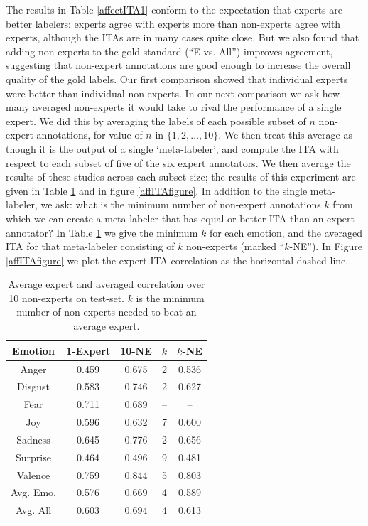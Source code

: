 \documentclass[11pt]{article}
\newlength{\tableReduceBot}
\begin{document}
The results in Table \ref{affectITA1} conform to the expectation that experts are better labelers: experts
agree with experts more than non-experts agree with experts, although the ITAs are in many cases quite close. But we also found that adding non-experts to the gold standard (``E vs. All'')
improves agreement, suggesting that non-expert annotations are good enough
to increase the overall quality of the gold labels.
Our first  comparison showed that individual experts were better than individual non-experts.
In our next comparison we ask how many averaged non-experts it would take to rival the performance of a single expert.
We did this by averaging the labels of each possible subset of $n$ non-expert annotations, for value of $n$ in $\{1, 2, \ldots, 10\}$.  We then treat this average as though it is the output of a single `meta-labeler', and compute the ITA with respect to each subset of five of the six expert annotators.  We then average the results of these studies across each subset size; the results of this experiment are given in Table \ref{affectITA2} and in figure \ref{affITAfigure}.  In addition to the single meta-labeler, we ask:  what is the minimum number of non-expert annotations $k$ from which we can create a meta-labeler that has equal or better ITA than an expert annotator?  In Table \ref{affectITA2} we give the minimum $k$ for each emotion, and the averaged ITA for that meta-labeler consisting of $k$ non-experts (marked ``$k$-NE'').  In Figure \ref{affITAfigure} we plot the expert ITA correlation as the horizontal dashed line.

\begin{table}[h]
\footnotesize
    \begin{center}
        \begin{tabular}{|c||c|c|c|c|}
        \hline
        Emotion & 1-Expert & 10-NE & $k$ & $k$-NE \\
        \hline
        Anger & 0.459 &  0.675 & 2 & 0.536 \\
        Disgust & 0.583 & 0.746 & 2 & 0.627 \\
        Fear & 0.711 & 0.689 &-- & -- \\
        Joy & 0.596 & 0.632  & 7 & 0.600 \\
        Sadness & 0.645 & 0.776 & 2 & 0.656 \\
        Surprise & 0.464 & 0.496 & 9 & 0.481 \\
        Valence & 0.759 & 0.844 & 5 & 0.803\\
        \hline
        Avg. Emo. & 0.576 & 0.669 & 4 & 0.589 \\
        Avg. All & 0.603 & 0.694 & 4 & 0.613 \\  %
        \hline
        \end{tabular}
    \caption{Average expert and averaged correlation over 10 non-experts on test-set.  $k$ is the minimum number of non-experts needed to beat an average expert.}\label{affectITA2}
\end{center}
\vspace*{-0.1in}
\end{table}
\end{document}
